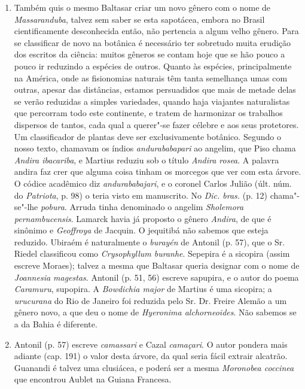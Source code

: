 \begin{enumerate}
\item Também quis o mesmo Baltasar criar um novo gênero com o nome de \textit{Massaranduba}, 
talvez sem saber se esta sapotácea, embora no Brasil cientificamente 
desconhecida então, não pertencia a algum velho gênero. Para se classificar de novo 
na botânica é necessário ter sobretudo muita erudição dos escritos da ciência: muitos 
gêneros se contam hoje que se hão pouco a pouco ir reduzindo a espécies de outros. 
Quanto às espécies, principalmente na América, onde as fisionomias naturais têm tanta 
semelhança umas com outras, apesar das distâncias, estamos persuadidos que mais de 
metade delas se verão reduzidas a simples variedades, quando haja viajantes 
naturalistas que percorram todo este continente, e tratem de harmonizar os trabalhos 
dispersos de tantos, cada qual a querer"-se fazer célebre e aos seus protetores.  Um 
classificador de plantas deve ser exclusivamente botânico.
Segundo o nosso texto, chamavam os índios \textit{andurababapari} ao angelim, que Piso 
chama \textit{Andira ibacariba}, e Martius reduziu sob o título \textit{Andira rosea}. A palavra andira faz 
crer que alguma coisa tinham os morcegos que ver com esta árvore.
O códice acadêmico diz \textit{andurababajari}, e o coronel Carlos Julião (últ. núm. do \textit{Patriota}, p. 98) 
o teria visto em manuscrito. No \textit{Dic. bras.} (p. 12) chama"-se"-lhe \textit{pobura}. 
Arruda tinha denominado o angelim \textit{Sholemora pernambucensis}. Lamarck havia já proposto 
o gênero \textit{Andira}, de que é sinônimo e \textit{Geoffroya} de Jacquin. O jequitibá não 
sabemos que esteja reduzido. Ubiraém é naturalmente o \textit{burayén} de 
Antonil (p. 57), que o Sr. Riedel classificou como \textit{Crysophyllum buranhe}. Sepepira é a 
sicopira (assim escreve Moraes); talvez a mesma que Baltasar queria designar com o nome 
de \textit{Joannesia magestas}. Antonil (p. 51, 56) escreve sapupira, e o autor do poema  
\textit{Caramuru}, supopira. A \textit{Bowdichia major} de Martius é uma sicopira; a \textit{urucurana} do Rio de 
Janeiro foi reduzida pelo Sr. Dr. Freire Alemão a um gênero novo, a que deu o nome de 
\textit{Hyeronima alchorneoides}. Não sabemos se a da Bahia é diferente.

\item  Antonil (p. 57) escreve \textit{camassari} e Cazal \textit{camaçari}. O autor pondera mais 
adiante (cap. 191) o valor desta árvore, da qual seria fácil extrair alcatrão. Guanandi é 
talvez uma clusiácea, e poderá ser a mesma \textit{Moronobea coccinea} que encontrou Aublet 
na Guiana Francesa.


\end{enumerate}
